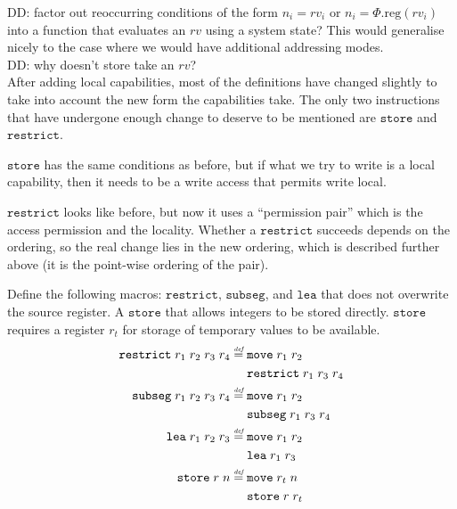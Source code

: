 \documentclass[a4paper]{article}
\newcommand{\defeq}{\stackrel{\textit{\tiny{def}}}{=}}
\newcommand\dominique[1]{{\color{purple} \sf \footnotesize {DD: #1}}\\}
\newcommand{\var}[1]{\mathit{#1}}
\newcommand{\rv}{\var{rv}}
\newcommand{\plainproj}[1]{\mathrm{#1}}
\newcommand{\memreg}[1][\Phi]{#1.\plainproj{reg}}
\newcommand{\zinstr}[1]{\mathtt{#1}}
\newcommand{\twoinstr}[3]{\zinstr{#1} \; #2 \; #3}
\newcommand{\move}[2]{\twoinstr{move}{#1}{#2}}
\newcommand{\store}[2]{\twoinstr{store}{#1}{#2}}
\newcommand{\lea}[2]{\twoinstr{lea}{#1}{#2}}
\newcommand{\threeinstr}[4]{\zinstr{#1} \; #2 \; #3 \; #4}
\newcommand{\restrict}[3]{\threeinstr{restrict}{#1}{#2}{#3}}
\newcommand{\subseg}[3]{\threeinstr{subseg}{#1}{#2}{#3}}
\begin{document}
\dominique{factor out reoccurring conditions of the form $n_i = \rv_i$ or $n_i =
  \memreg(\rv_i)$ into a function that evaluates an $\rv$ using a system state?
  This would generalise nicely to the case where we would have additional
  addressing modes.}

\dominique{why doesn't store take an $\rv$?}


After adding local capabilities, most of the definitions have changed slightly to take into account the new form the capabilities take. The only two instructions that have undergone enough change to deserve to be mentioned are $\mathtt{store}$ and $\mathtt{restrict}$. 

$\mathtt{store}$ has the same conditions as before, but if what we try to write is a local capability, then it needs to be a write access that permits write local.

$\mathtt{restrict}$ looks like before, but now it uses a ``permission pair'' which is the access permission and the locality. Whether a $\mathtt{restrict}$ succeeds depends on the ordering, so the real change lies in the new ordering, which is described further above (it is the point-wise ordering of the pair).

Define the following macros: $\mathtt{restrict}$, $\mathtt{subseg}$, and $\mathtt{lea}$ that does not overwrite the source register. A $\mathtt{store}$ that allows integers to be stored directly. $\mathtt{store}$ requires a register $r_t$ for storage of temporary values to be available.
\begin{align*}
  \restrict{r_1}{r_2}{r_3} \; r_4 &\defeq
                                    \begin{aligned}[t]
                                      & \move{r_1}{r_2} \\
                                      & \restrict{r_1}{r_3}{r_4}
                                    \end{aligned} \\
  \subseg{r_1}{r_2}{r_3} \; r_4   &\defeq
                                    \begin{aligned}[t]
                                      & \move{r_1}{r_2} \\
                                      & \subseg{r_1}{r_3}{r_4}
                                    \end{aligned}\\
  \lea{r_1}{r_2} \; r_3           &\defeq
                                    \begin{aligned}[t]
                                      & \move{r_1}{r_2} \\
                                      & \lea{r_1}{r_3}
                                    \end{aligned}\\
  \store{r}{n} &\defeq
                 \begin{aligned}[t]
                   & \move{r_t}{n} \\
                   & \store{r}{r_t}
                 \end{aligned}
\end{align*}
\end{document}
